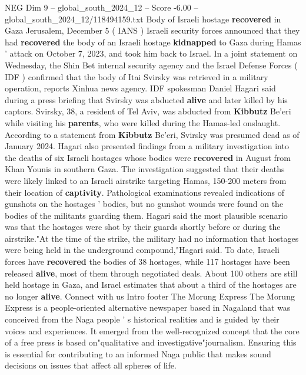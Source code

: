 \begin{textsample}{NEG Dim 9 – global\_south\_2024\_12 – Score -6.00 – global\_south\_2024\_12/118494159.txt}  \label{ex:f9_neg_212}
Body of Israeli hostage \textbf{recovered} in Gaza Jerusalem, December 5 ( IANS ) Israeli security forces announced that they had \textbf{recovered} the body of an Israeli hostage \textbf{kidnapped} to Gaza during Hamas ' attack on October 7, 2023, and took him back to Israel.
In a joint statement on Wednesday, the Shin Bet internal security agency and the Israel Defense Forces ( IDF ) confirmed that the body of Itai Svirsky was retrieved in a military operation, reports Xinhua news agency.
IDF spokesman Daniel Hagari said during a press briefing that Svirsky was abducted \textbf{alive} and later killed by his captors.
Svirsky, 38, a resident of Tel Aviv, was abducted from \textbf{Kibbutz} Be'eri while visiting his \textbf{parents}, who were killed during the Hamas-led onslaught.
According to a statement from \textbf{Kibbutz} Be'eri, Svirsky was presumed dead as of January 2024.
Hagari also presented findings from a military investigation into the deaths of six Israeli hostages whose bodies were \textbf{recovered} in August from Khan Younis in southern Gaza.
The investigation suggested that their deaths were likely linked to an Israeli airstrike targeting Hamas, 150-200 meters from their location of \textbf{captivity}.
Pathological examinations revealed indications of gunshots on the hostages ' bodies, but no gunshot wounds were found on the bodies of the militants guarding them.
Hagari said the most plausible scenario was that the hostages were shot by their guards shortly before or during the airstrike."At the time of the strike, the military had no information that hostages were being held in the underground compound,"Hagari said.
To date, Israeli forces have \textbf{recovered} the bodies of 38 hostages, while 117 hostages have been released \textbf{alive}, most of them through negotiated deals.
About 100 others are still held hostage in Gaza, and Israel estimates that about a third of the hostages are no longer \textbf{alive}.
Connect with us Intro footer The Morung Express The Morung Express is a people-oriented alternative newspaper based in Nagaland that was conceived from the Naga people ' s historical realities and is guided by their voices and experiences.
It emerged from the well-recognized concept that the core of a free press is based on"qualitative and investigative"journalism.
Ensuring this is essential for contributing to an informed Naga public that makes sound decisions on issues that affect all spheres of life.

\end{textsample}
